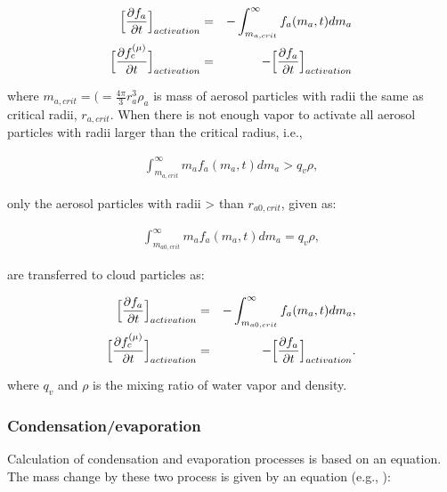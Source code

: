 \begin{eqnarray}
\Bigl[\frac{\partial f_{a}}{\partial t}\Bigr]_{activation}&=&-\int_{m_{a,crit}}^{\infty}f_{a}(m_{a},t)dm_{a}\label{s10-4}\\
\Bigl[\frac{\partial f_{c}^{(\mu)}}{\partial t}\Bigr]_{activation}&=&-\Bigl[\frac{\partial f_{a}}{\partial t}\Bigr]_{activation}\label{s10-5}
\end{eqnarray}

where $m_{a,crit}=\bigl(=\frac{4\pi}{3}r_{a}^{3}\rho_{a}$ is mass of aerosol particles with radii the same as critical radii, $r_{a,crit}$. When there is not enough vapor to activate all aerosol particles with radii larger than the critical radius, i.e.,

\begin{eqnarray}
\int_{m_{a,crit}}^{\infty}m_{a}f_{a}(m_{a},t)dm_{a} > q_{v}\rho,\label{s10-6}
\end{eqnarray}

only the aerosol particles with radii > than $r_{a0,crit}$, given as:

\begin{eqnarray}
\int_{m_{a0,crit}}^{\infty}m_{a}f_{a}(m_{a},t)dm_{a} = q_{v}\rho,\label{s10-7}
\end{eqnarray}


are transferred to cloud particles as:

\begin{eqnarray}
\Bigl[\frac{\partial f_{a}}{\partial t}\Bigr]_{activation}&=&-\int_{m_{a0,crit}}^{\infty}f_{a}(m_{a},t)dm_{a},\label{s10-8}\\
\Bigl[\frac{\partial f_{c}^{(\mu)}}{\partial t}\Bigr]_{activation}&=&-\Bigl[\frac{\partial f_{a}}{\partial t}\Bigr]_{activation}.\label{s10-9}
\end{eqnarray}

where $q_{v}$ and $\rho$ is the mixing ratio of water vapor and density.

\subsubsection{Condensation/evaporation}
Calculation of condensation and evaporation processes is based on an equation. The mass change by these two process is given by an equation (e.g., \cite{ry_1989}):

